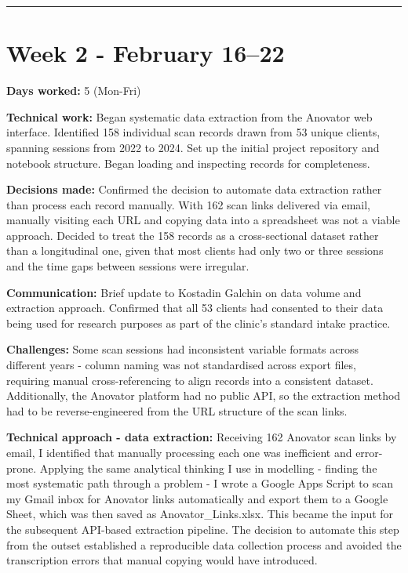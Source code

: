 \documentclass[11pt,a4paper]{article}
\begin{document}
\noindent\rule{\textwidth}{0.4pt}


\section{Week 2  -  February 16–22}

\textbf{Days worked:} 5 (Mon-Fri)

\textbf{Technical work:} Began systematic data extraction from the Anovator web interface. Identified 158 individual scan records drawn from 53 unique clients, spanning sessions from 2022 to 2024. Set up the initial project repository and notebook structure. Began loading and inspecting records for completeness.

\textbf{Decisions made:} Confirmed the decision to automate data extraction rather than process each record manually. With 162 scan links delivered via email, manually visiting each URL and copying data into a spreadsheet was not a viable approach. Decided to treat the 158 records as a cross-sectional dataset rather than a longitudinal one, given that most clients had only two or three sessions and the time gaps between sessions were irregular.

\textbf{Communication:} Brief update to Kostadin Galchin on data volume and extraction approach. Confirmed that all 53 clients had consented to their data being used for research purposes as part of the clinic's standard intake practice.

\textbf{Challenges:} Some scan sessions had inconsistent variable formats across different years  -  column naming was not standardised across export files, requiring manual cross-referencing to align records into a consistent dataset. Additionally, the Anovator platform had no public API, so the extraction method had to be reverse-engineered from the URL structure of the scan links.

\textbf{Technical approach  -  data extraction:} Receiving 162 Anovator scan links by email, I identified that manually processing each one was inefficient and error-prone. Applying the same analytical thinking I use in modelling  -  finding the most systematic path through a problem  -  I wrote a Google Apps Script to scan my Gmail inbox for Anovator links automatically and export them to a Google Sheet, which was then saved as Anovator\_Links.xlsx. This became the input for the subsequent API-based extraction pipeline. The decision to automate this step from the outset established a reproducible data collection process and avoided the transcription errors that manual copying would have introduced.
\end{document}
